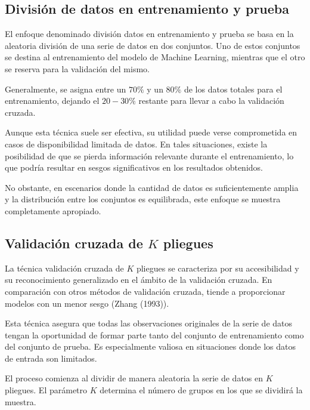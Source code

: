 \documentclass[
  us-letterpaper,
]{scrreprt}
\theoremstyle{plain}
\theoremstyle{definition}
\theoremstyle{plain}
\theoremstyle{definition}
\theoremstyle{remark}
\begin{document}
\subsection{División de datos en entrenamiento y
prueba}\label{divisiuxf3n-de-datos-en-entrenamiento-y-prueba}

El enfoque denominado división datos en entrenamiento y prueba se basa
en la aleatoria división de una serie de datos en dos conjuntos. Uno de
estos conjuntos se destina al entrenamiento del modelo de Machine
Learning, mientras que el otro se reserva para la validación del mismo.

Generalmente, se asigna entre un \(70\%\) y un \(80\%\) de los datos
totales para el entrenamiento, dejando el \(20-30\%\) restante para
llevar a cabo la validación cruzada.

Aunque esta técnica suele ser efectiva, su utilidad puede verse
comprometida en casos de disponibilidad limitada de datos. En tales
situaciones, existe la posibilidad de que se pierda información
relevante durante el entrenamiento, lo que podría resultar en sesgos
significativos en los resultados obtenidos.

No obstante, en escenarios donde la cantidad de datos es suficientemente
amplia y la distribución entre los conjuntos es equilibrada, este
enfoque se muestra completamente apropiado.

\subsection{\texorpdfstring{Validación cruzada de \(K\)
pliegues}{Validación cruzada de K pliegues}}\label{sec-validaciuxf3n-cruzada-de-k-pliegues}

La técnica validación cruzada de \(K\) pliegues se caracteriza por su
accesibilidad y su reconocimiento generalizado en el ámbito de la
validación cruzada. En comparación con otros métodos de validación
cruzada, tiende a proporcionar modelos con un menor sesgo (Zhang
(1993)).

Esta técnica asegura que todas las observaciones originales de la serie
de datos tengan la oportunidad de formar parte tanto del conjunto de
entrenamiento como del conjunto de prueba. Es especialmente valiosa en
situaciones donde los datos de entrada son limitados.

El proceso comienza al dividir de manera aleatoria la serie de datos en
\(K\) pliegues. El parámetro \(K\) determina el número de grupos en los
que se dividirá la muestra.
\end{document}
